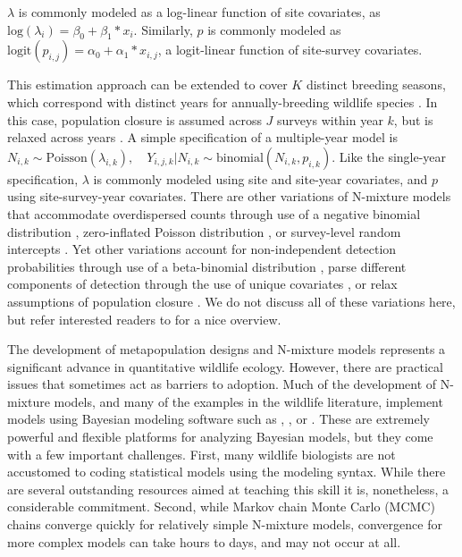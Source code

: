 \documentclass[article]{jss}
\begin{document}
$\lambda$ is commonly modeled as a log-linear function of site covariates, as $\text{log}(\lambda_i) = \beta_0 + \beta_1 * x_i$. Similarly, $p$ is commonly modeled as $\text{logit}(p_{i,j}) = \alpha_0 + \alpha_1 * x_{i,j}$, a logit-linear function of site-survey covariates.

This estimation approach can be extended to cover $K$ distinct breeding seasons, which correspond with distinct years for annually-breeding wildlife species \citep{Kery_Dorazio_Soldaat_Van_Strien_Zuiderwijk_Royle_2009}.  In this case, population closure is assumed across $J$ surveys within year $k$, but is relaxed across years \citep{Kery_Dorazio_Soldaat_Van_Strien_Zuiderwijk_Royle_2009}. A simple specification of a multiple-year model is $N_{i,k} \sim \text{Poisson}(\lambda_{i,k}), \quad Y_{i,j,k} | N_{i,k} \sim \text{binomial}(N_{i,k}, p_{i,k})$.  Like the single-year specification, $\lambda$ is commonly modeled using site and site-year covariates, and $p$ using site-survey-year covariates.  There are other variations of N-mixture models that accommodate overdispersed counts through use of a negative binomial distribution \citep{Kery_Royle_2010}, zero-inflated Poisson distribution \citep{Wenger_Freeman_2008}, or survey-level random intercepts \citep{Kery_Schaub_2011}.  Yet other variations account for non-independent detection probabilities through use of a beta-binomial distribution \citep{Martin_Royle_Mackenzie_Edwards_Kery_Gardner_2011}, parse different components of detection through the use of unique covariates \citep{O'Donnell_Thompson_III_Semlitsch_2015}, or relax assumptions of population closure \citep{Chandler_Royle_King_2011, Dail_Madsen_2011}.  We do not discuss all of these variations here, but refer interested readers to \cite{Denes_Silveira_Beissinger_2015} for a nice overview.

The development of metapopulation designs and N-mixture models represents a significant advance in quantitative wildlife ecology.  However, there are practical issues that sometimes act as barriers to adoption.  Much of the development of N-mixture models, and many of the examples in the wildlife literature, implement models using Bayesian modeling software such as , , or  \citep{Lunn_Jackson_Best_Thomas_Spiegelhalter_2012}.  These are extremely powerful and flexible platforms for analyzing Bayesian models, but they come with a few important challenges.  First, many wildlife biologists are not accustomed to coding statistical models using the  modeling syntax.  While there are several outstanding resources aimed at teaching this skill \citep{Royle_Dorazio_2008, Kery_2010, Kery_Schaub_2011, Kery_Royle_2015} it is, nonetheless, a considerable commitment.  Second, while Markov chain Monte Carlo (MCMC) chains converge quickly for relatively simple N-mixture models, convergence for more complex models can take hours to days, and may not occur at all.
\end{document}
